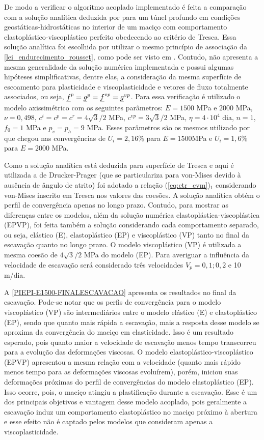 De modo a verificar o algoritmo acoplado implementado é feita a comparação com a solução analítica deduzida por  para um túnel profundo em condições geostáticas-hidrostáticas no interior de um maciço com comportamento elastoplástico-viscoplástico perfeito obedecendo ao critério de Tresca. Essa solução analítica foi escolhida por utilizar o mesmo princípio de associação da \autoref{lei_endurecimento_rousset}, como pode ser visto em . Contudo, não apresenta a mesma generalidade da solução numérica implementada e possui algumas hipóteses simplificativas, dentre elas, a consideração da mesma superfície de escoamento para plasticidade e viscoplasticidade e vetores de fluxo totalmente associados, ou seja, $\underline f^p = \underline{g}^{p} = \underline f^{vp} = \underline{g}^{vp}$. Para essa verificação é utilizado o modelo axissimétrico com os seguintes parâmetros: $E=1500$ MPa e $2000$ MPa, $\nu=0,498$, $c^i=c^p=c^r =4\sqrt{3}/2$ MPa, $c^{vp}=3\sqrt{3}/2$ MPa, $\eta = 4 \cdot 10^4$ dia, $n=1$, $f_0=1$ MPa e $p_v=p_h=9$ MPa. Esses parâmetros são os mesmos utilizado por  que chegou nas convergências de $U_i=2,16$\% para $E=1500$MPa e $U_i=1,6$\% para $E=2000$ MPa.

Como a solução analítica está deduzida para superfície de Tresca e aqui é utilizada a de Drucker-Prager (que se particulariza para von-Mises devido à ausência de ângulo de atrito) foi adotado a relação (\ref{eq:ctr_cvm})$_1$ considerando von-Mises inscrito em Tresca nos valores das coesões. A solução analítica obtém o perfil de convergência apenas no longo prazo. Contudo, para mostrar as diferenças entre os modelos, além da solução numérica elastoplástica-viscoplástica (EPVP), foi feita também a solução considerando cada comportamento separado, ou seja, elástico (E), elastoplástico (EP) e viscoplástico (VP) tanto no final da escavação quanto no longo prazo. O modelo viscoplástico (VP) é utilizada a mesma coesão de $4\sqrt{3}/2$ MPa do modelo (EP). Para averiguar a influência da velocidade de escavação será considerado três velocidades $V_p=0,1; 0,2$ e 10 m/dia.

A \autoref{PIEPI-E1500-FINALESCAVACAO} apresenta os resultados no final da escavação. Pode-se notar que os perfis de convergência para o modelo viscoplástico (VP) são intermediários entre o modelo elástico (E) e elastoplástico (EP), sendo que quanto mais rápida a escavação, mais a resposta desse modelo se  aproxima da convergência do maciço em elasticidade. Isso é um resultado esperado, pois quanto maior a velocidade de escavação menos tempo transcorreu para a evolução das deformações viscosas. O modelo elastoplástico-viscoplástico (EPVP) apresentou a mesma relação com a velocidade (quanto mais rápido menos tempo para as deformações viscosas evoluírem), porém, iniciou suas deformações próximas do perfil de convergências do modelo elastoplástico (EP). Isso ocorre, pois, o maciço atingiu a plastificação durante a escavação. Esse é um dos principais objetivos e vantagem desse modelo acoplado, pois geralmente a escavação induz um comportamento elastoplástico no maciço próximo à abertura e esse efeito não é captado pelos modelos que consideram apenas a viscoplasticidade.

